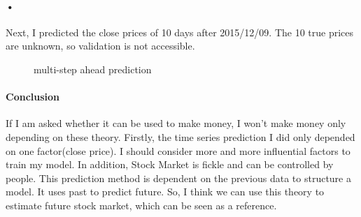 \documentclass{article}
\begin{document}
\paragraph{•}Next, I predicted the close prices of 10 days after 2015/12/09. The 10 true prices are unknown, so validation is not accessible.
\begin{figure}[htbp]
 \centering
 \caption{multi-step ahead prediction}
\end{figure}
\paragraph{Conclusion}If I am asked whether it can be used to make money, I won't make money only depending on these theory. Firstly, the time series prediction I did only depended on one factor(close price). I should consider more and more influential factors to train my model. In addition, Stock Market is fickle and can be controlled by people. This prediction method is dependent on the previous data to structure a model. It uses past to predict future. So, I think we can use this theory to estimate future stock market, which can be seen as a reference.
\end{document}
